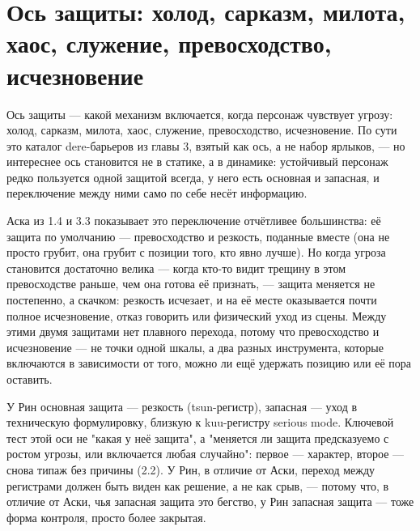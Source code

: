 \section{Ось защиты: холод, сарказм, милота, хаос, служение, превосходство, исчезновение}

Ось защиты — какой механизм включается, когда персонаж чувствует угрозу: холод, сарказм, милота, хаос, служение, превосходство, исчезновение. По сути это каталог dere-барьеров из главы 3, взятый как ось, а не набор ярлыков, — но интереснее ось становится не в статике, а в динамике: устойчивый персонаж редко пользуется одной защитой всегда, у него есть основная и запасная, и переключение между ними само по себе несёт информацию.

Аска из 1.4 и 3.3 показывает это переключение отчётливее большинства: её защита по умолчанию — превосходство и резкость, поданные вместе (она не просто грубит, она грубит с позиции того, кто явно лучше). Но когда угроза становится достаточно велика — когда кто-то видит трещину в этом превосходстве раньше, чем она готова её признать, — защита меняется не постепенно, а скачком: резкость исчезает, и на её месте оказывается почти полное исчезновение, отказ говорить или физический уход из сцены. Между этими двумя защитами нет плавного перехода, потому что превосходство и исчезновение — не точки одной шкалы, а два разных инструмента, которые включаются в зависимости от того, можно ли ещё удержать позицию или её пора оставить.

У Рин основная защита — резкость (tsun-регистр), запасная — уход в техническую формулировку, близкую к kuu-регистру serious mode. Ключевой тест этой оси не "какая у неё защита", а "меняется ли защита предсказуемо с ростом угрозы, или включается любая случайно": первое — характер, второе — снова типаж без причины (2.2). У Рин, в отличие от Аски, переход между регистрами должен быть виден как решение, а не как срыв, — потому что, в отличие от Аски, чья запасная защита это бегство, у Рин запасная защита — тоже форма контроля, просто более закрытая.
